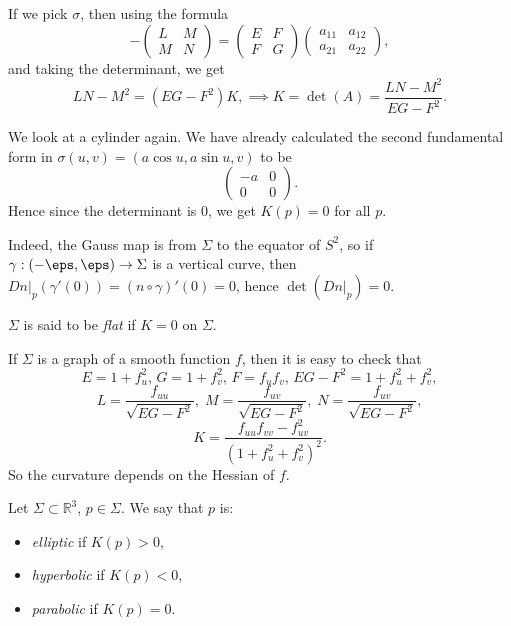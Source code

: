 \documentclass[12pt]{article}
\begin{document}
If we pick $\sigma$, then using the formula
\[
-
\begin{pmatrix}
	L & M \\
	M & N
\end{pmatrix}
=
\begin{pmatrix}
	E & F \\
	F & G
\end{pmatrix}
\begin{pmatrix}
	a_{11} & a_{12} \\
	a_{21} & a_{22}
\end{pmatrix}
,\]
and taking the determinant, we get
\[
LN - M^2 = (EG-F^2)K, \implies K = \det(A) = \frac{LN-M^2}{EG - F^2}
.\]

\begin{exbox}
	We look at a cylinder again. We have already calculated the second fundamental form in $\sigma(u, v) = (a \cos u, a \sin u, v)$ to be
	\[
	\begin{pmatrix}
		-a & 0 \\
		0 & 0
	\end{pmatrix}
	.\]
	Hence since the determinant is $0$, we get $K(p) = 0$ for all $p$.

	Indeed, the Gauss map is from $\Sigma$ to the equator of $S^2$, so if $\gamma : (-\eps, \eps) \to \Sigma$ is a vertical curve, then $Dn|_p(\gamma'(0)) = (n \circ \gamma)'(0) = 0$, hence $\det (Dn|_p) = 0$.
\end{exbox}

\begin{definition}
	$\Sigma$ is said to be \emph{flat} if $K = 0$ on $\Sigma$.
\end{definition}

\begin{exbox}
	If $\Sigma$ is a graph of a smooth function $f$, then it is easy to check that
	\[
	E = 1+f_u^2,\, G = 1+f_v^2,\, F = f_uf_v, \, EG-F^2 = 1 + f_u^2 + f_v^2
	,\]
	\[
		L = \frac{f_{uu}}{\sqrt{EG-F^2}}, \; M = \frac{f_{uv}}{\sqrt{EG-F^2}}, \; N = \frac{f_{uv}}{\sqrt{EG-F^2}}
	,\]
	\[
	K = \frac{f_{uu}f_{vv} - f_{uv}^2}{(1+f_u^2+f_v^2)^2}
	.\]
	So the curvature depends on the Hessian of $f$.
\end{exbox}

\begin{definition}
	Let $\Sigma \subset \mathbb{R}^3$, $p \in \Sigma$. We say that $p$ is:
	\begin{itemize}
		\item \emph{elliptic} if $K(p) > 0$,
		\item \emph{hyperbolic} if $K(p) < 0$,
		\item \emph{parabolic} if $K(p) = 0$.
	\end{itemize}
\end{definition}
\end{document}
